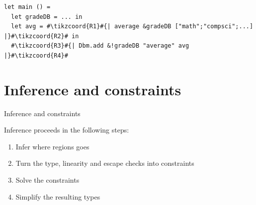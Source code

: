 \documentclass[aspectratio=169,dvipsnames,svgnames,10pt]{beamer}
\begin{document}
\begin{frame}[fragile]
\begin{onlyenv}
\begin{onlyenv}
\begin{verbatim}
let main () =
  let gradeDB = ... in
  let avg = #\tikzcoord{R1}#{| average &gradeDB ["math";"compsci";...] |}#\tikzcoord{R2}# in
  #\tikzcoord{R3}#{| Dbm.add &!gradeDB "average" avg |}#\tikzcoord{R4}#
\end{verbatim}
    \end{onlyenv}%
  \end{onlyenv}%
\end{frame}

\section{Inference and constraints}

\begin{frame}{Inference and constraints}

  Inference proceeds in the following steps:

  \begin{enumerate}
  \item Infer where regions goes
  \item Turn the type, linearity and escape checks into constraints
  \item Solve the constraints
  \item Simplify the resulting types
  \end{enumerate}
\end{frame}


\end{document}
